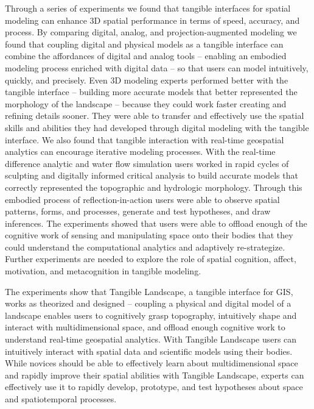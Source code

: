 \documentclass[prodmode,acmtochi]{acmsmall} %
\begin{document}
Through a series of experiments
we found that tangible interfaces for spatial modeling
can enhance 3D spatial performance 
in terms of speed, accuracy, and process. 
By comparing digital, analog, and projection-augmented modeling 
we found that coupling digital and physical models as a tangible interface 
can combine the affordances of digital and analog tools
-- enabling an embodied modeling process enriched with digital data --
so that users can model intuitively, quickly, and precisely. 
Even 3D modeling experts 
 performed better with the tangible interface 
-- building more accurate models 
that better represented the morphology of the landscape --
 because they could work faster
 creating and refining details sooner.
They were able to transfer and effectively use the
spatial skills and abilities they had developed through digital modeling
with the tangible interface.
We also found that tangible interaction with real-time geospatial analytics
can encourage iterative modeling processes.
With the real-time difference analytic and water flow simulation  
users worked in rapid cycles of 
sculpting and digitally informed critical analysis
to build accurate models that
correctly represented the topographic and hydrologic morphology.
Through this embodied process of reflection-in-action 
users were able to
observe spatial patterns, forms, and processes, 
generate and test hypotheses, 
and draw inferences. 
The experiments showed that users 
were able to offload enough of the cognitive work 
of sensing and manipulating space
onto their bodies
that they could understand the
computational analytics
and adaptively re-strategize.
Further experiments are needed
to explore the role of 
spatial cognition, affect, motivation, and metacognition 
in tangible modeling.

The experiments show that Tangible Landscape,
a tangible interface for GIS, 
works as theorized and designed -- 
coupling a physical and digital model of a landscape
enables users to 
cognitively grasp topography,
intuitively shape and interact with multidimensional space, 
and offload enough cognitive work to understand 
real-time geospatial analytics. 
With Tangible Landscape users can intuitively interact with 
spatial data and scientific models using their bodies. 
While novices should be able to effectively learn about 
multidimensional space and
rapidly improve their spatial abilities 
with Tangible Landscape, 
experts can effectively use it to 
rapidly develop, prototype, and test 
hypotheses about space and spatiotemporal processes.
\end{document}

